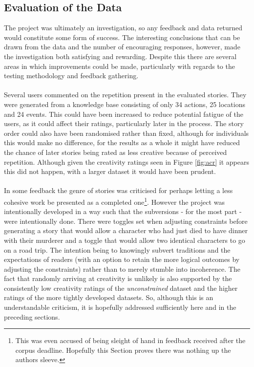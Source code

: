 \documentclass[letterpaper]{article}
\begin{document}
\subsection{Evaluation of the Data}
The project was ultimately an investigation, so any feedback and data returned would constitute some form of success. The interesting conclusions that can be drawn from the data and the number of encouraging responses, however, made the investigation both satisfying and rewarding. Despite this there are several areas in which improvements could be made, particularly with regards to the testing methodology and feedback gathering.\\
\\Several users commented on the repetition present in the evaluated stories. They were generated from a knowledge base consisting of only 34 actions, 25 locations and 24 events. This could have been increased to reduce potential fatigue of the users, as it could affect their ratings, particularly later in the process. The story order could also have been randomised rather than fixed, although for individuals this would make no difference, for the results as a whole it might have reduced the chance of later stories being rated as less creative because of perceived repetition. Although given the creativity ratings seen in Figure \ref{fig:acr} it appears this did not happen, with a larger dataset it would have been prudent.\\
\\In some feedback the genre of stories was criticised for perhaps letting a less cohesive work be presented as a completed one\footnote{This was even accused of being sleight of hand in feedback received after the corpus deadline. Hopefully this Section proves there was nothing up the authors sleeve.}. However the project was intentionally developed in a way such that the subversions - for the most part - were intentionally done. There were toggles set when adjusting constraints before generating a story that would allow a character who had just died to have dinner with their murderer and a toggle that would allow two identical characters to go on a road trip. The intention being to knowingly subvert traditions and the expectations of readers (with an option to retain the more logical outcomes by adjusting the constraints) rather than to merely stumble into incoherence. The fact that randomly arriving at creativity is unlikely is also supported by the consistently low creativity ratings of the \emph{unconstrained} dataset and the higher ratings of the more tightly developed datasets. So, although this is an understandable criticism, it is hopefully addressed sufficiently here and in the preceding sections.\\
\end{document}
